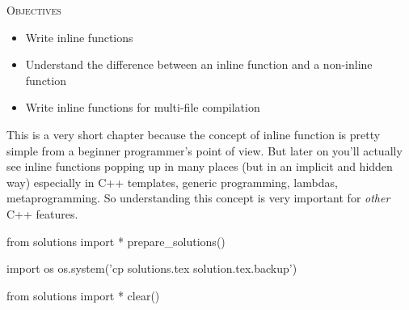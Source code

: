 
\textsc{Objectives}
\begin{itemize}
\item Write inline functions
\item Understand the difference between an inline function and a non-inline function
\item Write inline functions for multi-file compilation
\end{itemize}

This is a very short chapter because the concept of inline function is pretty simple from a beginner programmer's point of view. But later on you'll actually see inline functions popping up in many places (but in an implicit and hidden way) especially in C++ templates, generic programming, lambdas, metaprogramming. So understanding this concept is very important for \textit{other} C++ features.





\begin{python0}
from solutions import *
prepare_solutions()
\end{python0}
\begin{python}
import os
os.system('cp solutions.tex solution.tex.backup')  
\end{python}

\begin{python0}
from solutions import *
clear()
\end{python0}

